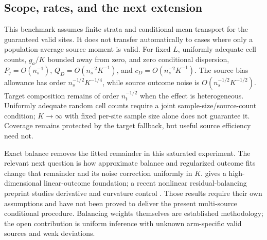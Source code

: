 \subsection{Scope, rates, and the next extension}

This benchmark assumes finite strata and conditional-mean transport for the
guaranteed valid sites. It does not transfer automatically to cases where only
a population-average source moment is valid. For fixed $L$, uniformly adequate
cell counts, $g_a/K$ bounded away from zero, and zero conditional dispersion,
$P_j=O(n_s^{-1})$, $Q_D=O(n_s^{-2}K^{-1})$, and
$c_D=O(n_s^{-2}K^{-1})$. The source bias allowance has order
$n_s^{-1/2}K^{-1/4}$, while source outcome noise is
$O(n_s^{-1/2}K^{-1/2})$. Target composition remains of order $n_t^{-1/2}$
when the effect is heterogeneous. Uniformly adequate random cell counts
require a joint sample-size/source-count condition; $K\to\infty$ with fixed
per-site sample size alone does not guarantee it. Coverage remains protected
by the target fallback, but useful source efficiency need not.

Exact balance removes the fitted remainder in this saturated experiment.
The relevant next question is how approximate balance and regularized outcome
fits change that remainder and its noise correction uniformly in $K$.
\citet{arb2018} gives a high-dimensional linear-outcome foundation; a recent
nonlinear residual-balancing preprint studies derivative and curvature control
\citep{meza2025}. Those results require their own assumptions and have not been
proved to deliver the present multi-source conditional procedure. Balancing
weights themselves are established methodology; the open contribution is
uniform inference with unknown arm-specific valid sources and weak deviations.
